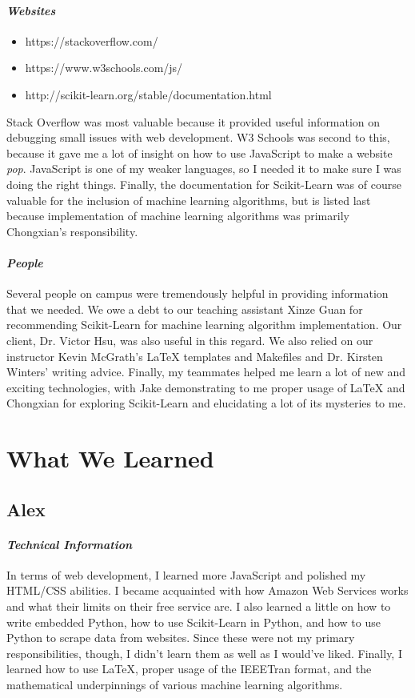\documentclass[onecolumn, draftclsnofoot,10pt, compsoc]{IEEEtran}
\begin{document}
\paragraph{\emph{Websites}}
\begin{itemize}
\item https://stackoverflow.com/ 
\item https://www.w3schools.com/js/
\item http://scikit-learn.org/stable/documentation.html
\end{itemize}
Stack Overflow was most valuable because it provided useful information on debugging small issues with web development. W3 Schools was second to this, because it gave me a lot of insight on how to use JavaScript to make a website \emph{pop}. JavaScript is one of my weaker languages, so I needed it to make sure I was doing the right things. Finally, the documentation for Scikit-Learn was of course valuable for the inclusion of machine learning algorithms, but is listed last because implementation of machine learning algorithms was primarily Chongxian's responsibility.
\paragraph{\emph{People}}
Several people on campus were tremendously helpful in providing information that we needed. We owe a debt to our teaching assistant Xinze Guan for recommending Scikit-Learn for machine learning algorithm implementation. Our client, Dr. Victor Hsu, was also useful in this regard. We also relied on our instructor Kevin McGrath's LaTeX templates and Makefiles and Dr. Kirsten Winters' writing advice. Finally, my teammates helped me learn a lot of new and exciting technologies, with Jake demonstrating to me proper usage of LaTeX and Chongxian for exploring Scikit-Learn and elucidating a lot of its mysteries to me. 
\section{What We Learned}
\subsection{Alex}
\paragraph{\emph{Technical Information}}
In terms of web development, I learned more JavaScript and polished my HTML/CSS abilities. I became acquainted with how Amazon Web Services works and what their limits on their free service are. I also learned a little on how to write embedded Python, how to use Scikit-Learn in Python, and how to use Python to scrape data from websites. Since these were not my primary responsibilities, though, I didn't learn them as well as I would've liked. Finally, I learned how to use LaTeX, proper usage of the IEEETran format, and the mathematical underpinnings of various machine learning algorithms.
\end{document}
